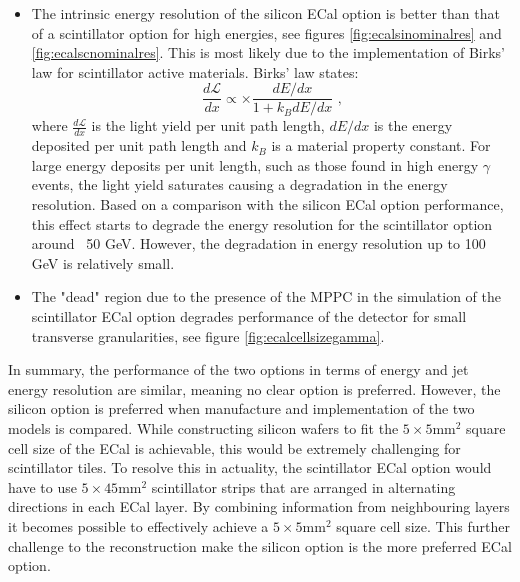 \begin{itemize}
\item The intrinsic energy resolution of the silicon ECal option is better than that of a scintillator option for high energies, see figures \ref{fig:ecalsinominalres} and \ref{fig:ecalscnominalres}.  This is most likely due to the implementation of Birks' law \cite{BirksLaw} for scintillator active materials.  Birks' law states:
\begin{equation}
\frac{d\mathcal{L}}{dx} \propto \times \frac{dE/dx}{1+k_{B}dE/dx}\text{ ,}
\end{equation}
where $\frac{d\mathcal{L}}{dx}$ is the light yield per unit path length, $dE/dx$ is the energy deposited per unit path length and $k_{B}$ is a material property constant.  For large energy deposits per unit length, such as those found in high energy $\gamma$ events, the light yield saturates causing a degradation in the energy resolution.  Based on a comparison with the silicon ECal option performance, this effect starts to degrade the energy resolution for the scintillator option around ~50 GeV.  However, the degradation in energy resolution up to 100 GeV is relatively small.
\item The "dead" region due to the presence of the MPPC in the simulation of the scintillator ECal option degrades performance of the detector for small transverse granularities, see figure \ref{fig:ecalcellsizegamma}.
\end{itemize}

In summary, the performance of the two options in terms of energy and jet energy resolution are similar, meaning no clear option is preferred.  However, the silicon option is preferred when manufacture and implementation of the two models is compared.  While constructing silicon wafers to fit the $5 \times 5 \text{mm}^{2}$ square cell size of the ECal is achievable, this would be extremely challenging for scintillator tiles.  To resolve this in actuality, the scintillator ECal option would have to use $5 \times 45 \text{mm}^{2}$ scintillator strips that are arranged in alternating directions in each ECal layer.  By combining information from neighbouring layers it becomes possible to effectively achieve a $5 \times 5 \text{mm}^{2}$ square cell size.  This further challenge to the reconstruction make the silicon option is the more preferred ECal option.  


